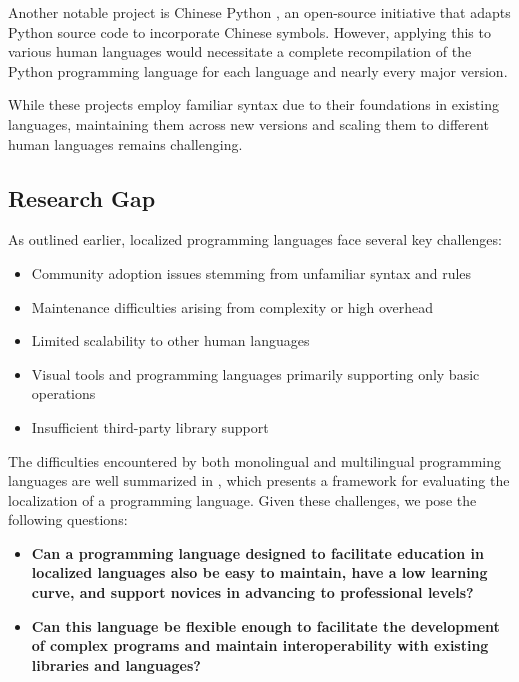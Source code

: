 \documentclass[conference]{IEEEtran}
\begin{document}
Another notable project is Chinese Python \cite{Glace_ChinesePython_2002}, an open-source initiative that adapts Python source code to incorporate Chinese symbols. However, applying this to various human languages would necessitate a complete recompilation of the Python programming language for each language and nearly every major version.

While these projects employ familiar syntax due to their foundations in existing languages, maintaining them across new versions and scaling them to different human languages remains challenging.

\subsection{Research Gap}

As outlined earlier, localized programming languages face several key challenges:

\begin{itemize}
\item Community adoption issues stemming from unfamiliar syntax and rules
\item Maintenance difficulties arising from complexity or high overhead
\item Limited scalability to other human languages
\item Visual tools and programming languages primarily supporting only basic operations
\item Insufficient third-party library support
\end{itemize}

The difficulties encountered by both monolingual and multilingual programming languages are well summarized in \cite{swidan2023framework}, which presents a framework for evaluating the localization of a programming language. Given these challenges, we pose the following questions:

\begin{itemize}
  \item \textbf{Can a programming language designed to facilitate education in localized languages also be easy to maintain, have a low learning curve, and support novices in advancing to professional levels?}
  
  \item \textbf{Can this language be flexible enough to facilitate the development of complex programs and maintain interoperability with existing libraries and languages?}
\end{itemize}
\end{document}
